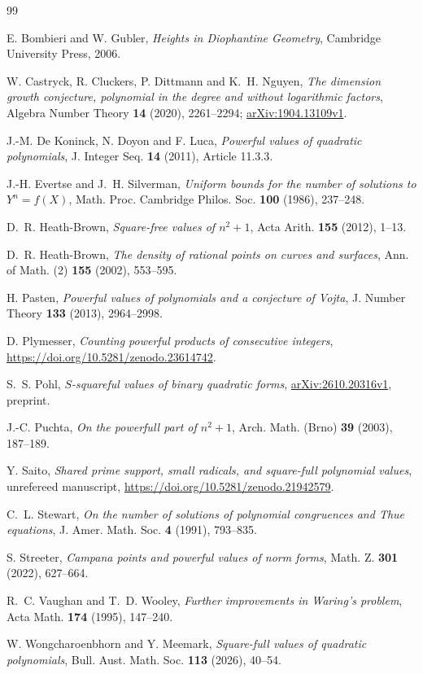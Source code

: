 \documentclass[11pt,reqno]{amsart}
\theoremstyle{definition}
\theoremstyle{remark}
\numberwithin{equation}{section}
\begin{document}
\clearpage
\begin{thebibliography}{99}

 E. Bombieri and W. Gubler, \emph{Heights in Diophantine Geometry}, Cambridge University Press, 2006.

 W. Castryck, R. Cluckers, P. Dittmann and K.~H. Nguyen, \emph{The dimension growth conjecture, polynomial in the degree and without logarithmic factors}, Algebra Number Theory \textbf{14} (2020), 2261--2294; \href{https://arxiv.org/abs/1904.13109v1}{arXiv:1904.13109v1}.

 J.-M. De Koninck, N. Doyon and F. Luca, \emph{Powerful values of quadratic polynomials}, J. Integer Seq. \textbf{14} (2011), Article 11.3.3.

 J.-H. Evertse and J.~H. Silverman, \emph{Uniform bounds for the number of solutions to $Y^n=f(X)$}, Math. Proc. Cambridge Philos. Soc. \textbf{100} (1986), 237--248.

 D.~R. Heath-Brown, \emph{Square-free values of $n^2+1$}, Acta Arith. \textbf{155} (2012), 1--13.

 D.~R. Heath-Brown, \emph{The density of rational points on curves and surfaces}, Ann. of Math. (2) \textbf{155} (2002), 553--595.

 H. Pasten, \emph{Powerful values of polynomials and a conjecture of Vojta}, J. Number Theory \textbf{133} (2013), 2964--2998.

 D. Plymesser, \emph{Counting powerful products of consecutive integers}, \url{https://doi.org/10.5281/zenodo.23614742}.

 S.~S. Pohl, \emph{$S$-squareful values of binary quadratic forms}, \href{https://arxiv.org/abs/2610.20316v1}{arXiv:2610.20316v1}, preprint.

 J.-C. Puchta, \emph{On the powerfull part of $n^2+1$}, Arch. Math. (Brno) \textbf{39} (2003), 187--189.

 Y. Saito, \emph{Shared prime support, small radicals, and square-full polynomial values}, unrefereed manuscript, \url{https://doi.org/10.5281/zenodo.21942579}.

 C.~L. Stewart, \emph{On the number of solutions of polynomial congruences and Thue equations}, J. Amer. Math. Soc. \textbf{4} (1991), 793--835.

 S. Streeter, \emph{Campana points and powerful values of norm forms}, Math. Z. \textbf{301} (2022), 627--664.

 R.~C. Vaughan and T.~D. Wooley, \emph{Further improvements in Waring's problem}, Acta Math. \textbf{174} (1995), 147--240.

 W. Wongcharoenbhorn and Y. Meemark, \emph{Square-full values of quadratic polynomials}, Bull. Aust. Math. Soc. \textbf{113} (2026), 40--54.
\end{thebibliography}
\end{document}
